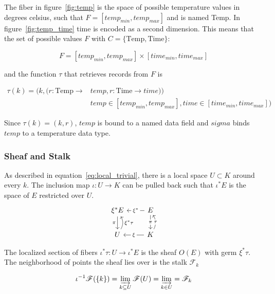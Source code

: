 \documentclass[../main.tex]{subfiles}
\begin{document}
The fiber in figure~\ref{fig:temp} is the space of possible temperature values in degrees celsius, such that $F=[temp_{min}, temp_{max}]$ and is named \textrm{Temp}. In figure~\ref{fig:temp_time} \textrm{time} is encoded as a second dimension. This means that the set of possible values $F$ with $C=\{\textrm{Temp}, \textrm{Time}\}$:

\begin{equation}
F = [temp_{min}, temp_{max}] \times [time_{min}, time_{max}]
\end{equation}

and the function $\tau$ that retrieves records from $F$ is

\begin{align}
\tau(k) =(k, (r: \textrm{Temp}\rightarrow &temp, r: \textrm{Time}\rightarrow time))\\
&temp \in [temp_{min}, temp_{max}], time \in [time_{min}, time_{max}])
\end{align}

Since $\tau(k)=(k, r)$, $temp$ is bound to a named data field and $sigma$ binds $temp$ to a temperature data type. 


\subsubsection{Sheaf and Stalk}
As described in equation~\ref{eq:local_trivial}, there is a local space $U \subset K$ around every $k$. The inclusion map $\iota: U \rightarrow K$ can be pulled back such that $\iota^{*}E$ is the space of $E$ restricted over $U$. 
\begin{equation}
    \begin{tikzcd}
        \xi^*E \arrow[d, "\pi"']              & E \arrow[d, "\pi" description] \arrow[l, "\xi^*" description]            \\
        U \arrow[u, "\xi^*\tau"', bend right] & K \arrow[u, "\tau" description, bend right] \arrow[l, "\xi" description]
        \end{tikzcd}
\end{equation}

The localized section of fibers $\iota^*\tau: U \rightarrow \iota^*E$ is the sheaf $O(E)$ with germ $\xi^*\tau$. The neighborhood of points the sheaf lies over is the stalk $\mathscr{F}_k$ \cite{StalkSheaf2019,spanier1989algebraic}

\begin{equation}
    \iota^{-1}\mathscr{F}(\{k\}) = \varinjlim_{k\subseteq U}\mathscr{F}(U) =  \varinjlim_{k \in U} = \mathscr{F}_k 
\end{equation}
\end{document}
